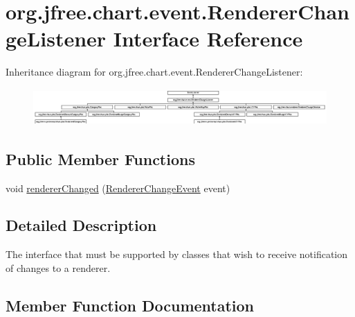 \hypertarget{interfaceorg_1_1jfree_1_1chart_1_1event_1_1_renderer_change_listener}{}\section{org.\+jfree.\+chart.\+event.\+Renderer\+Change\+Listener Interface Reference}
\label{interfaceorg_1_1jfree_1_1chart_1_1event_1_1_renderer_change_listener}
Inheritance diagram for org.\+jfree.\+chart.\+event.\+Renderer\+Change\+Listener\+:\begin{figure}[H]
\begin{center}
\leavevmode
\includegraphics[height=1.397206cm]{interfaceorg_1_1jfree_1_1chart_1_1event_1_1_renderer_change_listener}
\end{center}
\end{figure}
\subsection*{Public Member Functions}
\begin{DoxyCompactItemize}
\item 
void \mbox{\hyperlink{interfaceorg_1_1jfree_1_1chart_1_1event_1_1_renderer_change_listener_a1ad26540595e3f503db1803adcaad4e0}{renderer\+Changed}} (\mbox{\hyperlink{classorg_1_1jfree_1_1chart_1_1event_1_1_renderer_change_event}{Renderer\+Change\+Event}} event)
\end{DoxyCompactItemize}


\subsection{Detailed Description}
The interface that must be supported by classes that wish to receive notification of changes to a renderer. 

\subsection{Member Function Documentation}
\mbox{\label{interfaceorg_1_1jfree_1_1chart_1_1event_1_1_renderer_change_listener_a1ad26540595e3f503db1803adcaad4e0}} 
